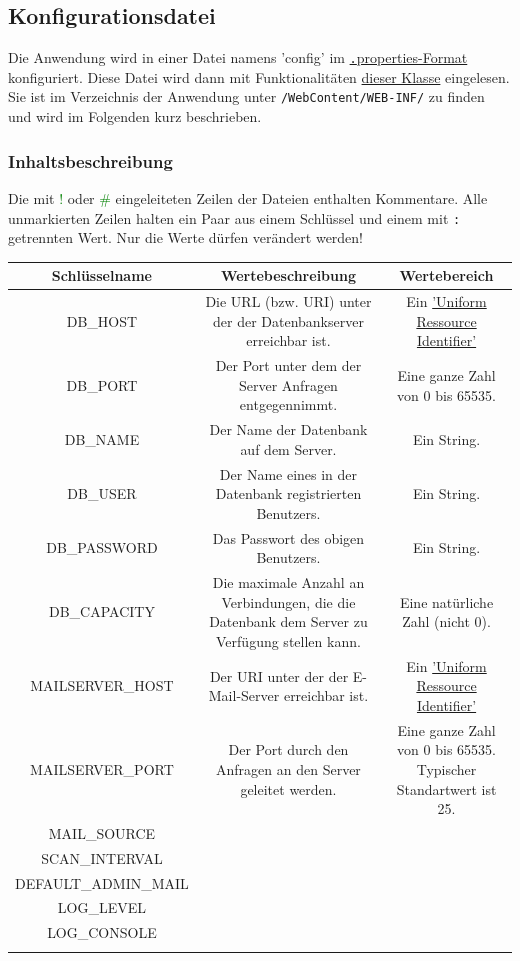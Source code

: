 \documentclass{article}
\begin{document}
\subsection{Konfigurationsdatei}
Die Anwendung wird in einer Datei namens 'config' im \hyperlink{https://de.wikipedia.org/wiki/Java-Properties-Datei}{{\texttt.properties}-Format} konfiguriert. Diese Datei wird dann mit Funktionalitäten \hyperlink{https://docs.oracle.com/javase/7/docs/api/java/util/Properties.html}{dieser Klasse} eingelesen. Sie ist im Verzeichnis der Anwendung unter \texttt{/WebContent/WEB-INF/} zu finden und wird im Folgenden kurz beschrieben.
\subsubsection{Inhaltsbeschreibung}
Die mit \textcolor{green}{!} oder \textcolor{green}{\#} eingeleiteten Zeilen der Dateien enthalten Kommentare. Alle unmarkierten Zeilen halten ein Paar aus einem Schlüssel und einem mit \texttt{:} getrennten Wert. Nur die Werte dürfen verändert werden! 
\begin{center}
\begin{table}
\begin{tabular} {| c | c | c |}
\hline
Schlüsselname & Wertebeschreibung & Wertebereich \\
\hline
DB_HOST & Die URL (bzw. URI) unter der der Datenbankserver erreichbar ist.& Ein \hyperlink{https://datatracker.ietf.org/doc/html/rfc3986}{'Uniform Ressource Identifier'}\\
\hline
DB_PORT & Der Port unter dem der Server Anfragen entgegennimmt. & Eine ganze Zahl von 0 bis 65535.\\
\hline
DB_NAME & Der Name der Datenbank auf dem Server. & Ein String.\\
\hline
DB_USER & Der Name eines in der Datenbank registrierten Benutzers. & Ein String.\\
\hline
DB_PASSWORD & Das Passwort des obigen Benutzers. & Ein String. \\
\hline
DB_CAPACITY & Die maximale Anzahl an Verbindungen, die die Datenbank dem Server zu Verfügung stellen kann. & Eine natürliche Zahl (nicht 0).\\
\hline
MAILSERVER_HOST & Der URI unter der der E-Mail-Server erreichbar ist. &  Ein \hyperlink{https://datatracker.ietf.org/doc/html/rfc3986}{'Uniform Ressource Identifier'} \\ 
\hline
MAILSERVER_PORT & Der Port durch den Anfragen an den Server geleitet werden. & Eine ganze Zahl von 0 bis 65535. Typischer Standartwert ist 25. \\
\hline
MAIL_SOURCE &  & \\
\hline
SCAN_INTERVAL &  & \\
\hline
DEFAULT_ADMIN_MAIL &  & \\
\hline
LOG_LEVEL &  & \\
\hline
LOG_CONSOLE &  & \\
\hline
 & & \\
\hline
\end{tabular}
\end{table}
\end{center}
 
\end{document}
